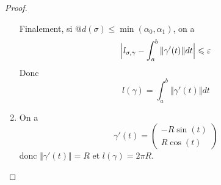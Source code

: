 \begin{proof}
\begin{enumerate}
		Finalement, si $@d(\sigma)\leqslant\min(\alpha_{0},\alpha_{1})$, on a 
		\begin{equation}\Bigl\vert l_{\sigma,\gamma}-\int_{a}^{b}\Vert\gamma'(t)\Vert dt\Bigr\vert\leqslant\varepsilon\end{equation}
		Donc 
		\begin{equation}l(\gamma)=\int_{a}^{b}\Vert\gamma'(t)\Vert dt\end{equation}

		\item On a 
		\begin{equation}\gamma'(t)=\begin{pmatrix}
			-R\sin(t)\\
			R\cos(t)
		\end{pmatrix}\end{equation}
		donc $\Vert\gamma'(t)\Vert=R$ et $l(\gamma)=2\pi R$.
	\end{enumerate}
\end{proof}

